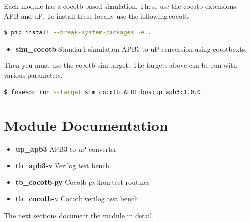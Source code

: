 Each module has a cocotb based simulation. These use the cocotb extensions APB and uP. To install
these locally use the following.cocotb
\begin{lstlisting}[language=bash]
  $ pip install --break-system-packages -e .
\end{lstlisting}

\begin{itemize}
  \item \textbf{sim\_cocotb} Standard simulation APB3 to uP conversion using cocotbexts.
\end{itemize}

Then you must use the cocotb sim target. The targets above can be run with various parameters.
\begin{lstlisting}[language=bash]
  $ fusesoc run --target sim_cocotb AFRL:bus:up_apb3:1.0.0
\end{lstlisting}

\newpage

\section{Module Documentation} \label{Module Documentation}

\par

\begin{itemize}
\item \textbf{up\_apb3} APB3 to uP converter\\
\item \textbf{tb\_apb3-v} Verilog test bench\\
\item \textbf{tb\_cocotb-py} Cocotb python test routines\\
\item \textbf{tb\_cocotb-v} Cocotb verilog test bench\\
\end{itemize}
The next sections document the module in detail.

